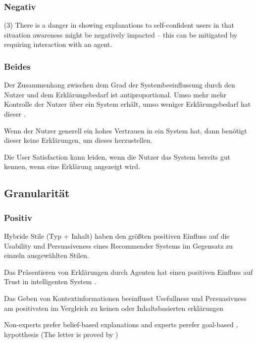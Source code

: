 \subsubsection*{Negativ}

(3) There is a danger in showing explanations to self-confident users in that situation awareness might be negatively impacted – this can be mitigated by requiring interaction with an agent. \cite{schaffer_i_2019}

\subsubsection*{Beides}

Der Zusammenhang zwischen dem Grad der Systembeeinflussung durch den Nutzer und dem Erklärungsbedarf ist antiproportional. Umso mehr mehr Kontrolle der Nutzer über ein System erhält, umso weniger Erklärungsbedarf hat dieser \cite{rosenfeld_explainability_2019}.

Wenn der Nutzer generell ein hohes Vertrauen in ein System hat, dann benötigt dieser keine Erklärungen, um dieses herzustellen. \cite{rosenfeld_explainability_2019, doshi2017towards}

Die User Satisfaction kann leiden, wenn die Nutzer das System bereits gut kennen, wenn eine Erklärung angezeigt wird.

\subsection*{Granularität}

\subsubsection*{Positiv}

Hybride Stile (Typ + Inhalt) haben den größten positiven Einfluss auf die Usability und Persuasiveness eines Recommender Systems im Gegensatz zu einzeln ausgewählten Stilen. \cite{sato_action-triggering_2019, kunkel_let_2019, sato_action-triggering_2019, schrills_color_2020, lim_2009_assessing}

Das Präsentieren von Erklärungen durch Agenten hat einen positiven Einfluss auf Trust in intelligenten System \cite{weitz_you_2019}.

Das Geben von Kontextinformationen beeinflusst Usefullness und Persuasivness am positivsten im Vergleich zu keinen oder Inhaltsbasierten erklärungen \cite{sato_action-triggering_2019}

Non-experts prefer belief-based explanations and experts perefer goal-based \cite{kaptein_personalised_2017}, hypotthesis (The letter is proved by \cite{martin_evaluating_2021})

